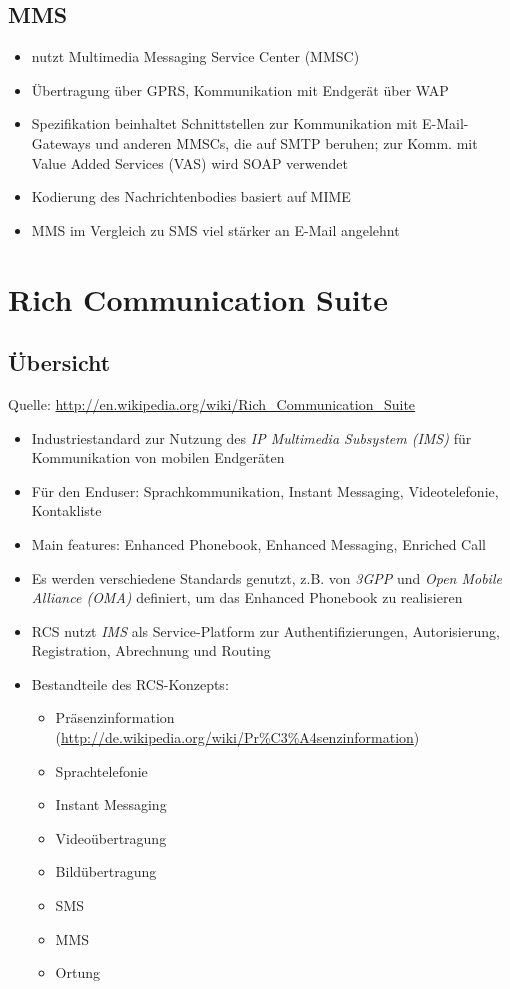 \documentclass[german,12pt,a4paper]{article}
\begin{document}
\subsection{MMS}
\begin{itemize}
	\item nutzt Multimedia Messaging Service Center (MMSC)
	\item Übertragung über GPRS, Kommunikation mit Endgerät über WAP
	\item Spezifikation beinhaltet Schnittstellen zur Kommunikation mit E-Mail-Gateways und anderen MMSCs, die auf 
		SMTP beruhen; zur Komm. mit Value Added Services (VAS) wird SOAP verwendet
	\item Kodierung des Nachrichtenbodies basiert auf MIME
	\item MMS im Vergleich zu SMS viel stärker an E-Mail angelehnt
\end{itemize}


\section{Rich Communication Suite} %
\label{sec:rcs}

\subsection{Übersicht} %
\label{sub:uebersicht}

Quelle: \url{http://en.wikipedia.org/wiki/Rich\_Communication\_Suite}
\begin{itemize}
	\item Industriestandard zur Nutzung des \textit{IP Multimedia Subsystem (IMS)} für Kommunikation von mobilen
		Endgeräten
	\item Für den Enduser: Sprachkommunikation, Instant Messaging, Videotelefonie,
		Kontakliste
	\item Main features: Enhanced Phonebook, Enhanced Messaging, Enriched Call
	\item Es werden verschiedene Standards genutzt, z.B. von \textit{3GPP} und  \textit{Open Mobile
		Alliance (OMA)} definiert, um das Enhanced Phonebook zu realisieren 
	\item RCS nutzt \textit{IMS} als Service-Platform zur Authentifizierungen, Autorisierung,
		Registration, Abrechnung und Routing
	\item Bestandteile des RCS-Konzepts:
		\begin{itemize}
			\item Präsenzinformation
				(\url{http://de.wikipedia.org/wiki/Pr%C3%A4senzinformation})
			\item Sprachtelefonie
			\item Instant Messaging
			\item Videoübertragung
			\item Bildübertragung
			\item SMS
			\item MMS
			\item Ortung
		\end{itemize}
\end{itemize}
\end{document}
